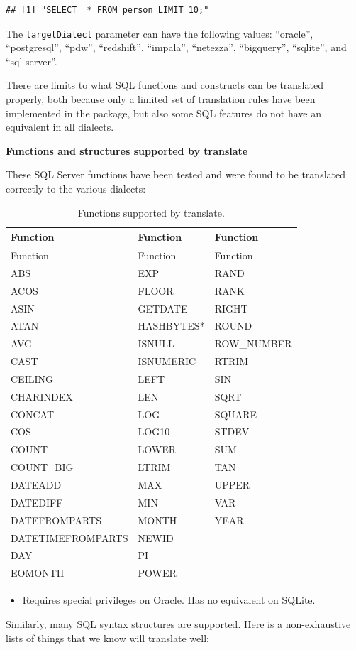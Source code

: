 \documentclass[11pt]{book}
\providecommand{\tightlist}{%
  \setlength{\itemsep}{0pt}\setlength{\parskip}{0pt}}
\begin{document}
\begin{verbatim}
## [1] "SELECT  * FROM person LIMIT 10;"
\end{verbatim}

The \texttt{targetDialect} parameter can have the following values:
``oracle'', ``postgresql'', ``pdw'', ``redshift'', ``impala'',
``netezza'', ``bigquery'', ``sqlite'', and ``sql server''.

There are limits to what SQL functions and constructs can be translated
properly, both because only a limited set of translation rules have been
implemented in the package, but also some SQL features do not have an
equivalent in all dialects.

\textbf{Functions and structures supported by translate}

These SQL Server functions have been tested and were found to be
translated correctly to the various dialects:

\begin{longtable}[]{@{}lll@{}}
\caption{\label{tab:sqlFunctions} Functions supported by
translate.}\tabularnewline
\toprule
Function & Function & Function\tabularnewline
\midrule
\endfirsthead
\toprule
Function & Function & Function\tabularnewline
\midrule
\endhead
ABS & EXP & RAND\tabularnewline
ACOS & FLOOR & RANK\tabularnewline
ASIN & GETDATE & RIGHT\tabularnewline
ATAN & HASHBYTES* & ROUND\tabularnewline
AVG & ISNULL & ROW\_NUMBER\tabularnewline
CAST & ISNUMERIC & RTRIM\tabularnewline
CEILING & LEFT & SIN\tabularnewline
CHARINDEX & LEN & SQRT\tabularnewline
CONCAT & LOG & SQUARE\tabularnewline
COS & LOG10 & STDEV\tabularnewline
COUNT & LOWER & SUM\tabularnewline
COUNT\_BIG & LTRIM & TAN\tabularnewline
DATEADD & MAX & UPPER\tabularnewline
DATEDIFF & MIN & VAR\tabularnewline
DATEFROMPARTS & MONTH & YEAR\tabularnewline
DATETIMEFROMPARTS & NEWID &\tabularnewline
DAY & PI &\tabularnewline
EOMONTH & POWER &\tabularnewline
\bottomrule
\end{longtable}

\begin{itemize}
\tightlist
\item
  Requires special privileges on Oracle. Has no equivalent on SQLite.
\end{itemize}

Similarly, many SQL syntax structures are supported. Here is a
non-exhaustive lists of things that we know will translate well:
\end{document}
